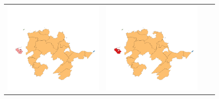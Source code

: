 \begin{figure}[p]
\begin{tabularx}{1\textwidth}{XXXX}
\includegraphics[width=1\linewidth]{images/ch6/contig/13}&
\includegraphics[width=1\linewidth]{images/ch6/contig/14}&

\end{tabularx}
\end{figure}
